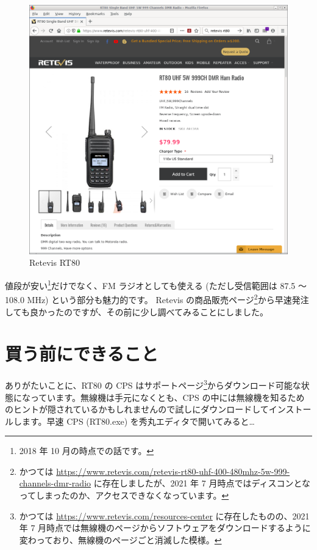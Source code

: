\documentclass[a4j,oneside]{ujbook}
\begin{document}
\begin{figure}[H]
 \centering
 \includegraphics[width=15cm]{img/rt80-web.png}
 \caption{Retevis RT80}
\end{figure}

値段が安い\footnote{2018 年 10 月の時点での話です。}だけでなく、FM ラジオとしても使える (ただし受信範囲は 87.5 〜 108.0 MHz) という部分も魅力的です。
Retevis の商品販売ページ\footnote{かつては \url{https://www.retevis.com/retevis-rt80-uhf-400-480mhz-5w-999-channels-dmr-radio} に存在しましたが、2021 年 7 月時点ではディスコンとなってしまったのか、アクセスできなくなっています。}から早速発注しても良かったのですが、その前に少し調べてみることにしました。

\section{買う前にできること}

ありがたいことに、RT80 の CPS はサポートページ\footnote{かつては \url{https://www.retevis.com/resources-center} に存在したものの、2021 年 7 月時点では無線機のページからソフトウェアをダウンロードするように変わっており、無線機のページごと消滅した模様。}からダウンロード可能な状態になっています。無線機は手元になくとも、CPS の中には無線機を知るためのヒントが隠されているかもしれませんので試しにダウンロードしてインストールします。早速 CPS (RT80.exe) を秀丸エディタで開いてみると…
\end{document}
